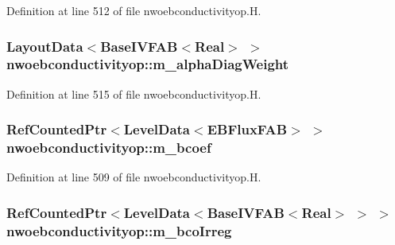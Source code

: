 Definition at line 512 of file nwoebconductivityop.\+H.

\subsubsection[{\texorpdfstring{m\+\_\+alpha\+Diag\+Weight}{m_alphaDiagWeight}}]{\setlength{\rightskip}{0pt plus 5cm}Layout\+Data$<$Base\+I\+V\+F\+AB$<$Real$>$ $>$ nwoebconductivityop\+::m\+\_\+alpha\+Diag\+Weight\hspace{0.3cm}{\ttfamily [protected]}}\hypertarget{classnwoebconductivityop_adfdc9c0747b83489af9856d0442f32a8}{}\label{classnwoebconductivityop_adfdc9c0747b83489af9856d0442f32a8}


Definition at line 515 of file nwoebconductivityop.\+H.

\subsubsection[{\texorpdfstring{m\+\_\+bcoef}{m_bcoef}}]{\setlength{\rightskip}{0pt plus 5cm}Ref\+Counted\+Ptr$<$Level\+Data$<$E\+B\+Flux\+F\+AB$>$ $>$ nwoebconductivityop\+::m\+\_\+bcoef\hspace{0.3cm}{\ttfamily [protected]}}\hypertarget{classnwoebconductivityop_a47523be820744efdc04ce5f1967f528a}{}\label{classnwoebconductivityop_a47523be820744efdc04ce5f1967f528a}


Definition at line 509 of file nwoebconductivityop.\+H.

\subsubsection[{\texorpdfstring{m\+\_\+bco\+Irreg}{m_bcoIrreg}}]{\setlength{\rightskip}{0pt plus 5cm}Ref\+Counted\+Ptr$<$Level\+Data$<$Base\+I\+V\+F\+AB$<$Real$>$ $>$ $>$ nwoebconductivityop\+::m\+\_\+bco\+Irreg\hspace{0.3cm}{\ttfamily [protected]}}\hypertarget{classnwoebconductivityop_ad7a0e1f0039264be015097a5bf6bde97}{}\label{classnwoebconductivityop_ad7a0e1f0039264be015097a5bf6bde97}


